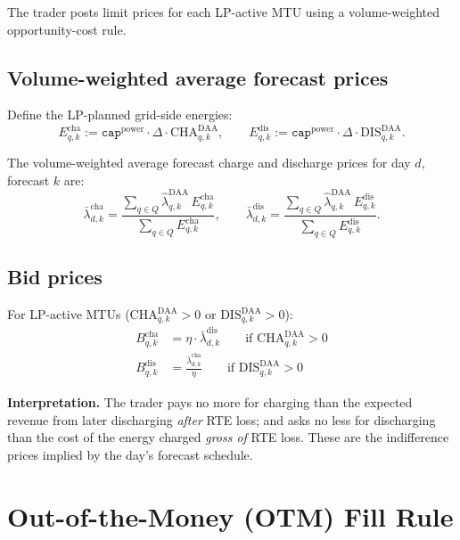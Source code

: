 \documentclass{article}
\numberwithin{equation}{subsection}
\begin{document}
The trader posts limit prices for each LP-active MTU using a volume-weighted opportunity-cost rule.

\subsection{Volume-weighted average forecast prices}

Define the LP-planned grid-side energies:
\begin{equation}
E^{\text{cha}}_{q,k} := \texttt{cap}^{\text{power}} \cdot \Delta \cdot \mathrm{CHA}^{\mathrm{DAA}}_{q,k},
\qquad
E^{\text{dis}}_{q,k} := \texttt{cap}^{\text{power}} \cdot \Delta \cdot \mathrm{DIS}^{\mathrm{DAA}}_{q,k}.
\end{equation}

The volume-weighted average forecast charge and discharge prices for day \(d\), forecast \(k\) are:
\begin{equation}
\bar{\lambda}^{\text{cha}}_{d,k}
= \frac{\sum_{q\in Q}\hat{\lambda}^{\text{DAA}}_{q,k}\,E^{\text{cha}}_{q,k}}
       {\sum_{q\in Q}E^{\text{cha}}_{q,k}},
\qquad
\bar{\lambda}^{\text{dis}}_{d,k}
= \frac{\sum_{q\in Q}\hat{\lambda}^{\text{DAA}}_{q,k}\,E^{\text{dis}}_{q,k}}
       {\sum_{q\in Q}E^{\text{dis}}_{q,k}}.
\end{equation}

\subsection{Bid prices}

For LP-active MTUs (\(\mathrm{CHA}^{\mathrm{DAA}}_{q,k} > 0\) or \(\mathrm{DIS}^{\mathrm{DAA}}_{q,k} > 0\)):
\begin{align}
B^{\text{cha}}_{q,k} &= \eta \cdot \bar{\lambda}^{\text{dis}}_{d,k}
\qquad\text{if } \mathrm{CHA}^{\mathrm{DAA}}_{q,k} > 0 \\
B^{\text{dis}}_{q,k} &= \frac{\bar{\lambda}^{\text{cha}}_{d,k}}{\eta}
\qquad\text{if } \mathrm{DIS}^{\mathrm{DAA}}_{q,k} > 0
\end{align}

\textbf{Interpretation.} The trader pays no more for charging than the expected revenue from later discharging \emph{after} RTE loss; and asks no less for discharging than the cost of the energy charged \emph{gross of} RTE loss. These are the indifference prices implied by the day's forecast schedule.


\section{Out-of-the-Money (OTM) Fill Rule}
\end{document}
